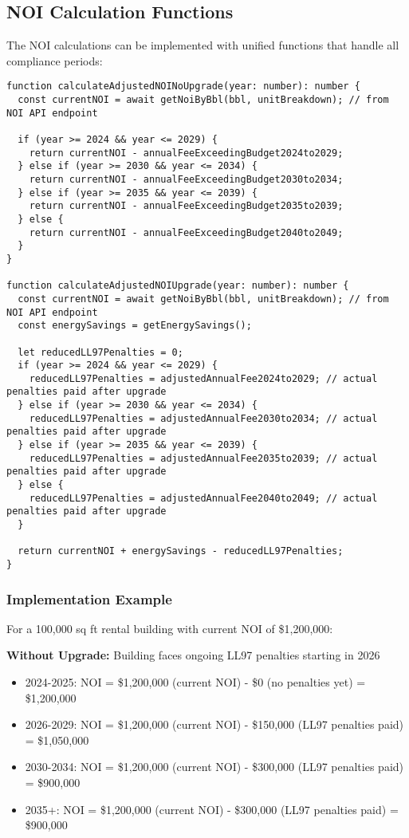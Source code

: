 \documentclass{article}
\begin{document}
\subsection{NOI Calculation Functions}

The NOI calculations can be implemented with unified functions that handle all compliance periods:

\begin{lstlisting}
function calculateAdjustedNOINoUpgrade(year: number): number {
  const currentNOI = await getNoiByBbl(bbl, unitBreakdown); // from NOI API endpoint
  
  if (year >= 2024 && year <= 2029) {
    return currentNOI - annualFeeExceedingBudget2024to2029;
  } else if (year >= 2030 && year <= 2034) {
    return currentNOI - annualFeeExceedingBudget2030to2034;
  } else if (year >= 2035 && year <= 2039) {
    return currentNOI - annualFeeExceedingBudget2035to2039;
  } else {
    return currentNOI - annualFeeExceedingBudget2040to2049;
  }
}

function calculateAdjustedNOIUpgrade(year: number): number {
  const currentNOI = await getNoiByBbl(bbl, unitBreakdown); // from NOI API endpoint
  const energySavings = getEnergySavings();
  
  let reducedLL97Penalties = 0;
  if (year >= 2024 && year <= 2029) {
    reducedLL97Penalties = adjustedAnnualFee2024to2029; // actual penalties paid after upgrade
  } else if (year >= 2030 && year <= 2034) {
    reducedLL97Penalties = adjustedAnnualFee2030to2034; // actual penalties paid after upgrade  
  } else if (year >= 2035 && year <= 2039) {
    reducedLL97Penalties = adjustedAnnualFee2035to2039; // actual penalties paid after upgrade
  } else {
    reducedLL97Penalties = adjustedAnnualFee2040to2049; // actual penalties paid after upgrade
  }
  
  return currentNOI + energySavings - reducedLL97Penalties;
}
\end{lstlisting}

\subsubsection{Implementation Example}

For a 100,000 sq ft rental building with current NOI of \$1,200,000:

\textbf{Without Upgrade:} Building faces ongoing LL97 penalties starting in 2026
\begin{itemize}
    \item 2024-2025: NOI = \$1,200,000 (current NOI) - \$0 (no penalties yet) = \$1,200,000
    \item 2026-2029: NOI = \$1,200,000 (current NOI) - \$150,000 (LL97 penalties paid) = \$1,050,000
    \item 2030-2034: NOI = \$1,200,000 (current NOI) - \$300,000 (LL97 penalties paid) = \$900,000
    \item 2035+: NOI = \$1,200,000 (current NOI) - \$300,000 (LL97 penalties paid) = \$900,000
\end{itemize}
\end{document}
